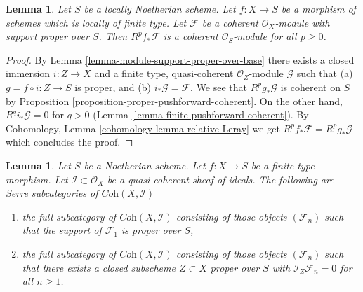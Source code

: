 \documentclass[10pt,a4paper]{amsart}
\theoremstyle{plain}
\newtheorem{lemma}[subsection]{Lemma}
\theoremstyle{definition}
\theoremstyle{remark}
\numberwithin{equation}{subsection}
\begin{document}
\begin{lemma}
\label{lemma-support-proper-over-base-pushforward}
Let $S$ be a locally Noetherian scheme.
Let $f : X \to S$ be a morphism of schemes which is locally of finite type.
Let $\mathcal{F}$ be a coherent $\mathcal{O}_X$-module
with support proper over $S$. Then $R^pf_*\mathcal{F}$
is a coherent $\mathcal{O}_S$-module for all $p \geq 0$.
\end{lemma}

\begin{proof}
By Lemma \ref{lemma-module-support-proper-over-base}
there exists a closed immersion $i : Z \to X$ and
a finite type, quasi-coherent $\mathcal{O}_Z$-module
$\mathcal{G}$ such that (a) $g = f \circ i : Z \to S$ is proper, and (b)
$i_*\mathcal{G} = \mathcal{F}$.
We see that $R^pg_*\mathcal{G}$ is coherent on $S$ by
Proposition \ref{proposition-proper-pushforward-coherent}.
On the other hand, $R^qi_*\mathcal{G} = 0$ for $q > 0$
(Lemma \ref{lemma-finite-pushforward-coherent}).
By Cohomology, Lemma \ref{cohomology-lemma-relative-Leray}
we get $R^pf_*\mathcal{F} = R^pg_*\mathcal{G}$ which concludes the proof.
\end{proof}

\begin{lemma}
\label{lemma-systems-with-proper-support}
Let $S$ be a Noetherian scheme. Let $f : X \to S$ be a finite type morphism.
Let $\mathcal{I} \subset \mathcal{O}_X$ be
a quasi-coherent sheaf of ideals. The following are Serre subcategories
of $\textit{Coh}(X, \mathcal{I})$
\begin{enumerate}
\item the full subcategory of $\textit{Coh}(X, \mathcal{I})$
consisting of those objects $(\mathcal{F}_n)$ such that
the support of $\mathcal{F}_1$ is proper over $S$,
\item the full subcategory of $\textit{Coh}(X, \mathcal{I})$
consisting of those objects $(\mathcal{F}_n)$ such that
there exists a closed subscheme $Z \subset X$ proper over $S$
with $\mathcal{I}_Z \mathcal{F}_n = 0$ for all $n \geq 1$.
\end{enumerate}
\end{lemma}
\end{document}
